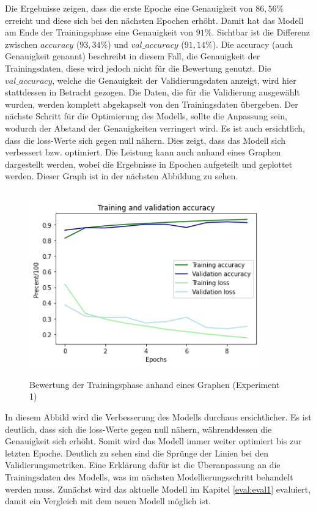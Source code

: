 \documentclass[12pt]{scrreprt}
\begin{document}
Die Ergebnisse zeigen, dass die erste Epoche eine Genauigkeit von $86,56\%$ erreicht und diese sich bei den nächsten Epochen erhöht. Damit hat das Modell am Ende der Trainingsphase eine Genauigkeit von $91\%$. Sichtbar ist die Differenz zwischen $accuracy$ ($93,34\%$) und $val\_accuracy$ ($91,14\%$). Die accuracy (auch Genauigkeit genannt) beschreibt in diesem Fall, die Genauigkeit der Trainingsdaten, diese wird jedoch nicht für die Bewertung genutzt. Die $val\_accuracy$, welche die Genauigkeit der Validierungsdaten anzeigt, wird hier stattdessen in Betracht gezogen. Die Daten, die für die Validierung ausgewählt wurden, werden komplett abgekapselt von den Trainingsdaten übergeben. Der nächste Schritt für die Optimierung des Modells, sollte die Anpassung sein, wodurch der Abstand der Genauigkeiten verringert wird. Es ist auch ersichtlich, dass die loss-Werte sich gegen null nähern. Dies zeigt, dass das Modell sich verbessert bzw. optimiert. Die Leistung kann auch anhand eines Graphen dargestellt werden, wobei die Ergebnisse in Epochen aufgeteilt und geplottet werden. Dieser Graph ist in der nächsten Abbildung zu sehen.\\
\begin{figure}[h!]
	\centering
	\includegraphics[width=10cm,height=8cm]		{ExperimentModelBewertungsgraf_1.png}
	\caption{ Bewertung der Trainingsphase anhand eines Graphen \cite{HK22}(Experiment 1)}
	\label{fig:fig15}
\end{figure}
	
In diesem Abbild wird die Verbesserung des Modells durchaus ersichtlicher. Es ist deutlich, dass sich die loss-Werte gegen null nähern, währenddessen die Genauigkeit sich erhöht. Somit wird das Modell immer weiter optimiert bis zur letzten Epoche. Deutlich zu sehen sind die Sprünge der Linien bei den Validierungsmetriken. Eine Erklärung dafür ist die Überanpassung an die Trainingsdaten des Modells, was im nächsten Modellierungsschritt behandelt werden muss. Zunächst wird das aktuelle Modell im Kapitel \ref{eval:eval1} evaluiert, damit ein Vergleich mit dem neuen Modell möglich ist.
	
\end{document}
